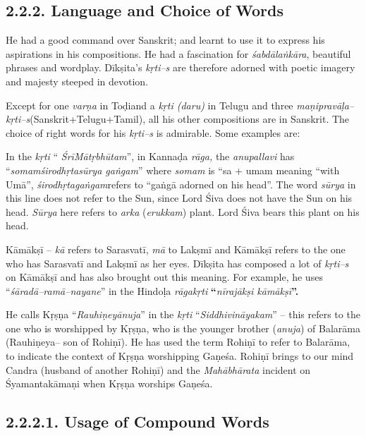 \subsection*{2.2.2. Language and Choice of Words}

He had a good command over Sanskrit; and learnt to use it to express his aspirations in his compositions. He had a fascination for \textit{śabdālaṅkāra}, beautiful phrases and wordplay. Dīkṣita’s \textit{kṛti–s} are therefore adorned with poetic imagery and majesty steeped in devotion.

Except for one \textit{varṇa} in Toḍiand a\textit{ kṛti (daru)} in Telugu and three \textit{maṇipravāḷa– kṛti–s}(Sanskrit+Telugu+Tamil), all his other compositions are in Sanskrit. The choice of right words for his \textit{kṛti–s} is admirable. Some examples are:

\item In the \textit{kṛti} “ \textit{ŚrīMātṛbhūtam}”, in Kannaḍa \textit{rāga,} the \textit{anupallavi} has “\textit{somamśirodhṛtasūrya gaṅgam}” where \textit{somam} is “sa + umam meaning “with Umā”, \textit{ śirodhṛtagaṅgam}refers to “gaṅgā adorned on his head”. The word \textit{sūrya} in this line does not refer to the Sun, since Lord Śiva does not have the Sun on his head. \textit{Sūrya} here refers to \textit{arka} (\textit{erukkam}) plant. Lord Śiva bears this plant on his head.

 \item Kāmākṣī – \textit{kā} refers to Sarasvatī, \textit{mā} to Lakṣmī and Kāmākṣī refers to the one who has Sarasvatī and Lakṣmī as her eyes. Dīkṣita has composed a lot of \textit{kṛti–s} on Kāmākṣī and has also brought out this meaning. For example, he uses “\textit{śāradā–ramā–nayane}” in the Hindoḷa\textit{ rāgakṛti} \textbf{“}\textit{nīrajākṣi kāmākṣī}\textbf{”.}

 \item He calls Kṛṣṇa “\textit{Rauhiṇeyānuja}” in the \textit{kṛti} “\textit{Siddhivināyakam}” – this refers to the one who is worshipped by Kṛṣṇa, who is the younger brother (\textit{anuja}) of Balarāma (Rauhiṇeya– son of Rohiṇī). He has used the term Rohiṇī to refer to Balarāma, to indicate the context of Kṛṣṇa worshipping Gaṇeśa. Rohiṇī brings to our mind Candra (husband of another Rohiṇī) and the \textit{Mahābhārata} incident on Śyamantakāmaṇi when Kṛṣṇa worships Gaṇeśa.


\subsection*{2.2.2.1. Usage of Compound Words}

